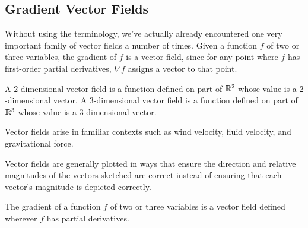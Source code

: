 

\subsection*{Gradient Vector Fields}

Without using the terminology, we've actually already encountered one
very important family of vector fields a number of times. Given a function $f$ of two or three variables, the gradient of
$f$ is a vector field, since for any point where $f$ has first-order
partial derivatives, $\nabla f$ assigns a vector to that point.




\begin{summary}
\item A $2$-dimensional vector field is a function defined on part of
  $\mathbb{R}^2$ whose value is a $2$-dimensional vector. A $3$-dimensional
  vector field is a function defined on part of $\mathbb{R}^3$ whose value is
  a $3$-dimensional vector.
\item Vector fields arise in familiar contexts such as wind velocity,
  fluid velocity, and gravitational force.
\item Vector fields are generally plotted in ways that ensure the
  direction and relative magnitudes of the vectors sketched are
  correct instead of ensuring that each vector's magnitude is
  depicted correctly.
\item The gradient of a function $f$ of two or three variables is a vector
  field defined wherever $f$ has partial derivatives.
\end{summary}

\nin \hrulefill

%

\clearpage

